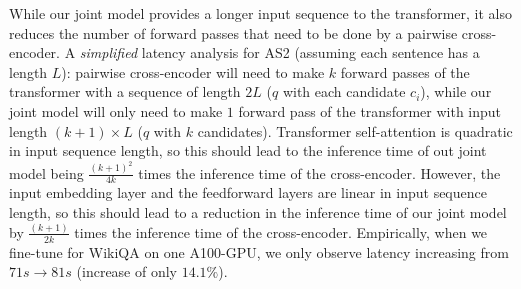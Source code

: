  While our joint model provides a longer input sequence to the transformer, it also reduces the number of forward passes that need to be done by a pairwise cross-encoder. A \emph{simplified} latency analysis for AS2 (assuming each sentence has a length $L$): pairwise cross-encoder will need to make $k$ forward passes of the transformer with a sequence of length $2L$ ($q$ with each candidate $c_i$), while our joint model will only need to make $1$ forward pass of the transformer with input length $(k{+}1){\times}L$ ($q$ with $k$ candidates). Transformer self-attention is quadratic in input sequence length, so this should lead to the inference time of out joint model being $\frac{(k+1)^2}{4k}$ times the inference time of the cross-encoder. However, the input embedding layer and the feedforward layers are linear in input sequence length, so this should lead to a reduction in the inference time of our joint model by $\frac{(k+1)}{2k}$ times the inference time of the cross-encoder. Empirically, when we fine-tune for WikiQA on one A100-GPU, we only observe latency increasing from $71s {\rightarrow} 81s$ (increase of only $14.1\%$).